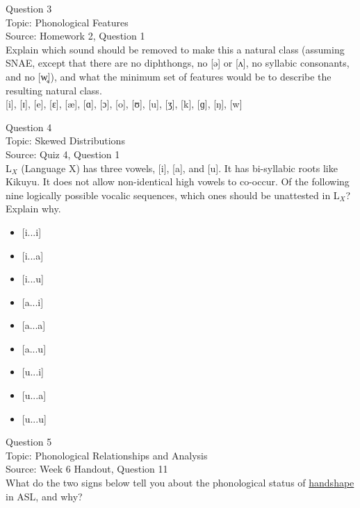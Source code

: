 \documentclass[12pt]{article}
\begin{document}
{\large Question 3}\\

Topic: Phonological Features\\
Source: Homework 2, Question 1\\

Explain which sound should be removed to make this a natural class (assuming SNAE, except that there are no diphthongs, no [ə] or [ʌ], no syllabic consonants, and no [w̥]), and what the minimum set of features would be to describe the resulting natural class.\\

{[i]}, {[ɪ]}, {[e]}, {[ɛ]}, {[æ]}, {[ɑ]}, {[ɔ]}, {[o]}, {[ʊ]}, {[u]}, {[ʒ]}, {[k]}, {[ɡ]}, {[ŋ]}, {[w]}


\newpage

{\large Question 4}\\

Topic: Skewed Distributions\\
Source: Quiz 4, Question 1\\

L$_X$ (Language X) has three vowels, [i], [a], and [u]. It has bi-syllabic roots like Kikuyu. It does not allow non-identical high vowels to co-occur. Of the following nine logically possible vocalic sequences, which ones should be unattested in L$_X$? Explain why.\\

\begin{itemize} \item {[i...i]} \item {[i...a]} \item {[i...u]} \item {[a...i]} \item {[a...a]} \item {[a...u]} \item {[u...i]} \item {[u...a]} \item {[u...u]} \end{itemize}


\newpage

{\large Question 5}\\

Topic: Phonological Relationships and Analysis\\
Source: Week 6 Handout, Question 11\\

What do the two signs below tell you about the phonological status of \underline{handshape} in ASL, and why?\\
\end{document}
